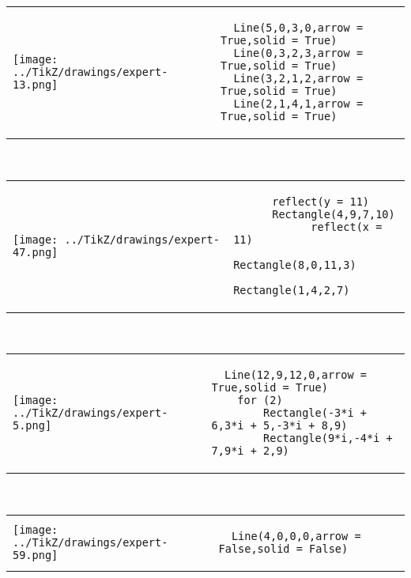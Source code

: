         \begin{tabular}{ll}
\texttt{[image: ../TikZ/drawings/expert-13.png]}&
        \begin{minipage}{10cm}
        \begin{verbatim}
  Line(5,0,3,0,arrow = True,solid = True)
  Line(0,3,2,3,arrow = True,solid = True)
  Line(3,2,1,2,arrow = True,solid = True)
  Line(2,1,4,1,arrow = True,solid = True)
        \end{verbatim}
\end{minipage}
\end{tabular}        
        \\

        \begin{tabular}{ll}
\texttt{[image: ../TikZ/drawings/expert-47.png]}&
        \begin{minipage}{10cm}
        \begin{verbatim}
      reflect(y = 11)
      Rectangle(4,9,7,10)
            reflect(x = 11)
            Rectangle(8,0,11,3)
            Rectangle(1,4,2,7)
        \end{verbatim}
\end{minipage}
\end{tabular}        
        \\

        \begin{tabular}{ll}
\texttt{[image: ../TikZ/drawings/expert-5.png]}&
        \begin{minipage}{10cm}
        \begin{verbatim}
  Line(12,9,12,0,arrow = True,solid = True)
    for (2)
        Rectangle(-3*i + 6,3*i + 5,-3*i + 8,9)
        Rectangle(9*i,-4*i + 7,9*i + 2,9)
        \end{verbatim}
\end{minipage}
\end{tabular}        
        \\

        \begin{tabular}{ll}
\texttt{[image: ../TikZ/drawings/expert-59.png]}&
        \begin{minipage}{10cm}
        \begin{verbatim}
  Line(4,0,0,0,arrow = False,solid = False)
        \end{verbatim}
\end{minipage}
\end{tabular}        
        \\

